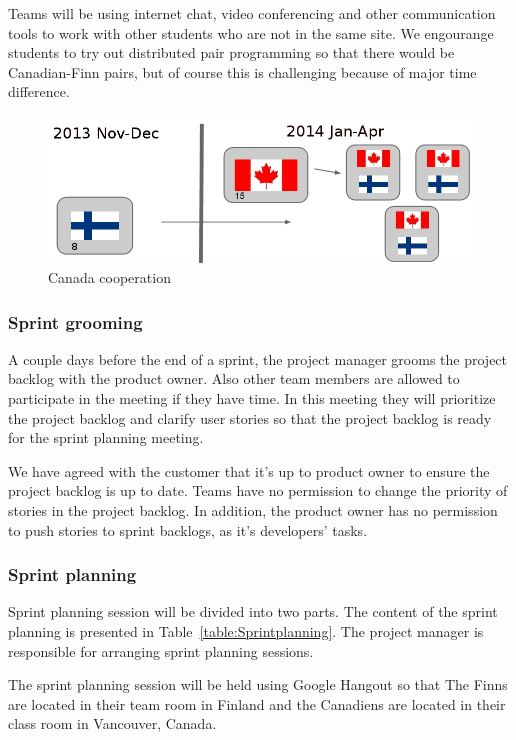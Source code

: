 Teams will be using internet chat, video conferencing and other
communication tools to work with other students who are not in the same site. We
engourange students to try out distributed pair programming so that there would
be Canadian-Finn pairs, but of course this is challenging because of major time
difference.

\begin{figure}[H]
\centering
\includegraphics[width=1\textwidth]{imgs/canadacooperation.jpg}
\caption{Canada cooperation}
\label{fig:cooperation}
\end{figure}

\subsubsection{Sprint grooming}

A couple days before the end of a sprint, the project manager grooms the
project backlog with the product owner. Also other team members are allowed to
participate in the meeting if they have time. In this meeting they will
prioritize the project backlog and clarify user stories so that the project
backlog is ready for the sprint planning meeting.

We have agreed with the customer that it's up to product owner to ensure the
project backlog is up to date. Teams have no permission to change the priority
of stories in the project backlog. In addition, the product owner has no
permission to push stories to sprint backlogs, as it's developers' tasks.

\subsubsection{Sprint planning}

Sprint planning session will be divided into two parts. The content of the
sprint planning is presented in Table~\ref{table:Sprintplanning}. The project
manager is responsible for arranging sprint planning sessions.

The sprint planning session will be held using Google Hangout so that The Finns
are located in their team room in Finland and the Canadiens are located in their
class room in Vancouver, Canada.

